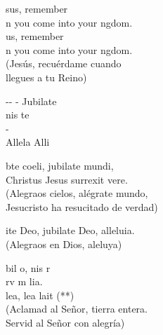\documentclass[12pt]{article}
\begin{document}
\begin{multicols*}{2}
\begin{cancion}%
	sus, remember \\
	n you come into your ngdom.\\
	us, remember \\
	n you come into your ngdom.\\
(Jesús, recuérdame cuando \\
 llegues a tu Reino)\\
\end{cancion}%

\begin{cancion}%
	-- -  Jubilate \\
	nis te\\
	  - \\
	Allela Alli\\
\end{cancion}%

\begin{cancion}%
	bte coeli, jubilate mundi,\\
Christus Jesus surrexit vere.\\
(Alegraos cielos, alégrate mundo,\\
 Jesucristo ha resucitado de verdad)\\
\end{cancion}%

\begin{cancion}%
	ite Deo, jubilate Deo, alleluia.\\
(Alegraos en Dios, aleluya)\\
\end{cancion}%

\begin{cancion}%
	bil o, nis r\\
	rv m  lia.\\
\jump
	lea, lea  lait (**)\\
(Aclamad al Señor, tierra entera.\\
 Servid al Señor con alegría)\\
\end{cancion}%


\end{multicols*}
\end{document}
